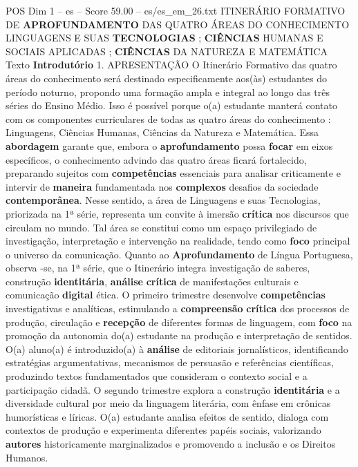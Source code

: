 \begin{textsample}{POS Dim 1 – es – Score 59.00 – es/es\_em\_26.txt}  \label{ex:f1_pos_192}
ITINERÁRIO FORMATIVO DE \textbf{APROFUNDAMENTO} DAS QUATRO ÁREAS DO CONHECIMENTO LINGUAGENS E SUAS \textbf{TECNOLOGIAS} ; \textbf{CIÊNCIAS} HUMANAS E SOCIAIS APLICADAS ; \textbf{CIÊNCIAS} DA NATUREZA E MATEMÁTICA Texto \textbf{Introdutório} 1.
APRESENTAÇÃO O Itinerário Formativo das quatro áreas do conhecimento será destinado especificamente aos(às) estudantes do período noturno, propondo uma formação ampla e integral ao longo das três séries do Ensino Médio.
Isso é possível porque o(a) estudante manterá contato com os componentes curriculares de todas as quatro áreas do conhecimento : Linguagens, Ciências Humanas, Ciências da Natureza e Matemática.
Essa \textbf{abordagem} garante que, embora o \textbf{aprofundamento} possa \textbf{focar} em eixos específicos, o conhecimento advindo das quatro áreas ficará fortalecido, preparando sujeitos com \textbf{competências} essenciais para analisar criticamente e intervir de \textbf{maneira} fundamentada nos \textbf{complexos} desafios da sociedade \textbf{contemporânea}.
Nesse sentido, a área de Linguagens e suas Tecnologias, priorizada na 1ª série, representa um convite à imersão \textbf{crítica} nos discursos que circulam no mundo.
Tal área se constitui como um espaço privilegiado de investigação, interpretação e intervenção na realidade, tendo como \textbf{foco} principal o universo da comunicação.
Quanto ao \textbf{Aprofundamento} de Língua Portuguesa, observa -se, na 1ª série, que o Itinerário integra investigação de saberes, construção \textbf{identitária}, \textbf{análise} \textbf{crítica} de manifestações culturais e comunicação \textbf{digital} ética.
O primeiro trimestre desenvolve \textbf{competências} investigativas e analíticas, estimulando a \textbf{compreensão} \textbf{crítica} dos processos de produção, circulação e \textbf{recepção} de diferentes formas de linguagem, com \textbf{foco} na promoção da autonomia do(a) estudante na produção e interpretação de sentidos.
O(a) aluno(a) é introduzido(a) à \textbf{análise} de editoriais jornalísticos, identificando estratégias argumentativas, mecanismos de persuasão e referências científicas, produzindo textos fundamentados que consideram o contexto social e a participação cidadã.
O segundo trimestre explora a construção \textbf{identitária} e a diversidade cultural por meio da linguagem literária, com ênfase em crônicas humorísticas e líricas.
O(a) estudante analisa efeitos de sentido, dialoga com contextos de produção e experimenta diferentes papéis sociais, valorizando \textbf{autores} historicamente marginalizados e promovendo a inclusão e os Direitos Humanos.

\end{textsample}
